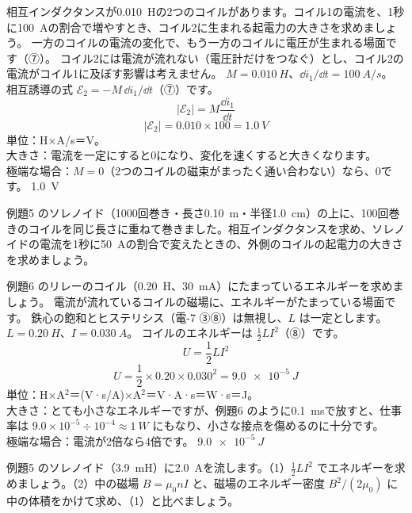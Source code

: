 \label{ph:電-8:ex7}
\begin{phreidai}[となりのコイルに生まれる電圧]
相互インダクタンスが\qty{0.010}{H}の2つのコイルがあります。コイル1の電流を、1秒に\qty{100}{A}の割合で増やすとき、コイル2に生まれる起電力の大きさを求めましょう。
\phbamen
一方のコイルの電流の変化で、もう一方のコイルに電圧が生まれる場面です（⑦）。
\phmushi
コイル2には電流が流れない（電圧計だけをつなぐ）とし、コイル2の電流がコイル1に及ぼす影響は考えません。
\phzu
$M=\qty{0.010}{H}$、$\dd i_1/\dd t=\qty{100}{A/s}$。
\phriyu
相互誘導の式 $\mathcal E_2=-M\,\dd i_1/\dd t$（⑦）です。
\phtateru
\[ |\mathcal E_2|=M\frac{\dd i_1}{\dd t} \]
\phtoku
\[ |\mathcal E_2|=0.010\times100=\qty{1.0}{V} \]
\phtashikame
単位：H×A/s＝V。\\
大きさ：電流を一定にすると0になり、変化を速くすると大きくなります。\\
極端な場合：$M=0$（2つのコイルの磁束がまったく通い合わない）なら、0です。
\kotae \qty{1.0}{V}
\end{phreidai}
\begin{jibun}
例題5 のソレノイド（1000回巻き・長さ\qty{0.10}{m}・半径\qty{1.0}{cm}）の上に、100回巻きのコイルを同じ長さに重ねて巻きました。相互インダクタンスを求め、ソレノイドの電流を1秒に\qty{50}{A}の割合で変えたときの、外側のコイルの起電力の大きさを求めましょう。
\end{jibun}

\label{ph:電-8:ex8}
\begin{phreidai}[リレーのコイルにたまるエネルギー]
例題6 のリレーのコイル（\qty{0.20}{H}、\qty{30}{mA}）にたまっているエネルギーを求めましょう。
\phbamen
電流が流れているコイルの磁場に、エネルギーがたまっている場面です。
\phmushi
鉄心の飽和とヒステリシス（電-7 ③⑧）は無視し、$L$ は一定とします。
\phzu
$L=\qty{0.20}{H}$、$I=\qty{0.030}{A}$。
\phriyu
コイルのエネルギーは $\tfrac12LI^2$（⑧）です。
\phtateru
\[ U=\frac12LI^2 \]
\phtoku
\[ U=\frac12\times0.20\times0.030^2=\qty{9.0e-5}{J} \]
\phtashikame
単位：H×A$^2$＝(V·s/A)×A$^2$＝V·A·s＝W·s＝J。\\
大きさ：とても小さなエネルギーですが、例題6 のように\qty{0.1}{ms}で放すと、仕事率は $9.0\times10^{-5}\div10^{-4}\approx\qty{1}{W}$ にもなり、小さな接点を傷めるのに十分です。\\
極端な場合：電流が2倍なら4倍です。
\kotae $\qty{9.0e-5}{J}$
\end{phreidai}
\begin{jibun}
例題5 のソレノイド（\qty{3.9}{mH}）に\qty{2.0}{A}を流します。（1）$\tfrac12LI^2$ でエネルギーを求めましょう。（2）中の磁場 $B=\mu_0nI$ と、磁場のエネルギー密度 $B^2/(2\mu_0)$ に中の体積をかけて求め、（1）と比べましょう。
\end{jibun}

